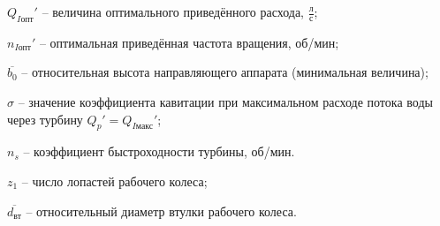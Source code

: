 \begin{landscape}
\vspace{0.1cm}

$Q_{I\text{опт}}'$ -- величина оптимального приведённого расхода, $\frac{\text{л}}{\text{с}}$;

\vspace{0.1cm}

$n_{I\text{опт}}'$  -- оптимальная приведённая частота вращения, об/мин;

\vspace{0.2cm}

$\overline{b_0}$ -- относительная высота направляющего аппарата (минимальная величина);

$\sigma$ -- значение коэффициента кавитации при максимальном расходе потока воды через турбину $Q_p' = Q_{I\text{макс}}'$;

$n_s$ -- коэффициент быстроходности турбины, об/мин.

$z_1$ -- число лопастей рабочего колеса;

\vspace{0.2cm}

$\overline{d_{\text{вт}}}$ -- относительный диаметр втулки рабочего колеса.


\end{landscape}





